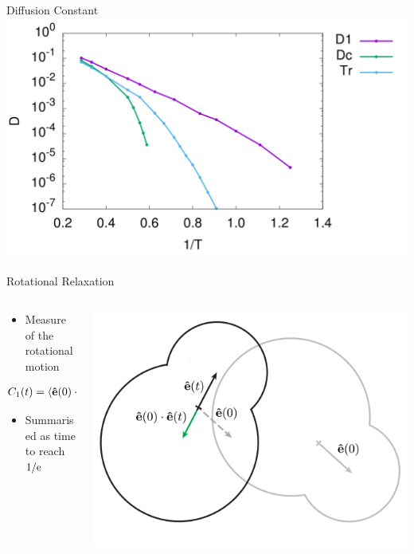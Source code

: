 \documentclass[16pt, aspectratio=43,compress]{beamer}
\begin{document}
\begin{frame}{Diffusion Constant}
    \centering
    \includegraphics[width=\textwidth]{D}
\end{frame}

\begin{frame}{Rotational Relaxation}
    \begin{columns}
        \begin{column}{0.5\linewidth}
            \begin{itemize}
                \item Measure of the rotational motion
            \end{itemize}
            \begin{align*}
                C_1(t) &= \langle \mathbf{\hat e}(0) \cdot \mathbf{\hat e}(t) \rangle
            \end{align*}
            \begin{itemize}
                \item Summarised as time to reach $1/\text{e}$
            \end{itemize}
        \end{column}
        \begin{column}{0.5\linewidth}
            \includegraphics[width=\textwidth]{rot}
        \end{column}
    \end{columns}
\end{frame}
\end{document}
